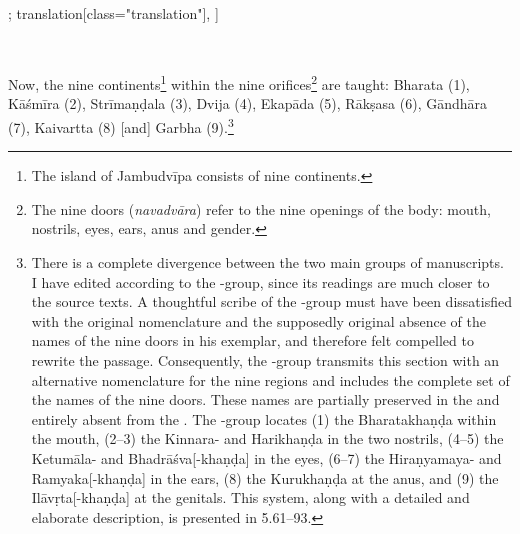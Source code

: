 \begin{alignment}[
  texts=edition[class="edition"];
  translation[class="translation"],
  ]
\begin{edition}
\begin{prose}[p38_01]
{  
  }\dd{}\hfill
{}\dd{}\hfill
{}\dd{}\hfill
{}\dd{}\\
\dd{}
\dd{}%
\end{prose}
  \end{edition}
  \begin{translation}
\begin{tlate}[p38_01] \noindent
  Now, the nine continents\footnote{The island of Jambudvīpa consists of nine continents.} within the nine orifices\footnote{The nine doors (\textit{navadvāra}) refer to the nine openings of the body: mouth, nostrils, eyes, ears, anus and gender.} are taught: Bharata (1), Kāśmīra (2), Strīmaṇḍala (3), Dvija (4), Ekapāda (5), Rākṣasa (6), Gāndhāra (7), Kaivartta (8) [and] Garbha (9).\footnote{There is a complete divergence between the two main groups of manuscripts. I have edited according to the \beta-group, since its readings are much closer to the source texts. A thoughtful scribe of the \gamma-group must have been dissatisfied with the original nomenclature and the supposedly original absence of the names of the nine doors in his exemplar, and therefore felt compelled to rewrite the passage. Consequently, the \gamma-group transmits this section with an alternative nomenclature for the nine regions and includes the complete set of the names of the nine doors. These names are partially preserved in the  and entirely absent from the . The \gamma-group locates (1) the Bharatakhaṇḍa within the mouth, (2–3) the Kinnara- and Harikhaṇḍa in the two nostrils, (4–5) the Ketumāla- and Bhadrāśva[-khaṇḍa] in the eyes, (6–7) the Hiraṇyamaya- and Ramyaka[-khaṇḍa] in the ears, (8) the Kurukhaṇḍa at the anus, and (9) the Ilāvṛta[-khaṇḍa] at the genitals. This system, along with a detailed and elaborate description, is presented in  5.61–93.}

\end{tlate}
\end{translation}
\end{alignment}
